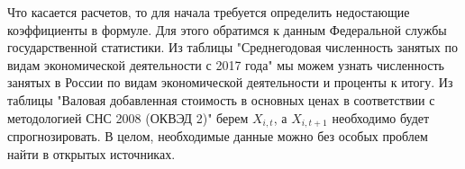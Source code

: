 Что касается расчетов, то для начала требуется определить недостающие коэффициенты в формуле.
Для этого обратимся к данным Федеральной службы государственной статистики. 
Из таблицы "Среднегодовая численность занятых по видам экономической деятельности с 2017
года"\cite{workers-count} мы можем узнать численность занятых в России по видам экономической деятельности
и проценты к итогу. Из таблицы "Валовая добавленная стоимость в основных ценах в соответствии с методологией СНС 2008 (ОКВЭД 2)" берем $X_{i, t}$, а $X_{i, t+1}$ необходимо будет спрогнозировать. В целом, необходимые данные можно без особых проблем найти в открытых источниках.

\clearpage